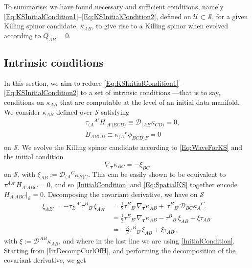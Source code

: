 \documentclass[10pt,a4paper]{article}
\theoremstyle{plain}
\begin{document}
To summarise: we have found necessary and sufficient conditions, namely \eqref{Eq:KSInitialCondition1}--\eqref{Eq:KSInitialCondition2}, defined on $\mathcal{U}\subset \mathcal{S}$, for a given Killing spinor candidate, $\kappa_{AB}$, to give rise to a Killing spinor when evolved according to $Q_{AB}=0$. 

\subsection{Intrinsic conditions}

In this section, we aim to reduce \eqref{Eq:KSInitialCondition1}--\eqref{Eq:KSInitialCondition2} to a set of intrinsic conditions ---that is to say, conditions on $\kappa_{AB}$ that are computable at the level of an initial data manifold. We consider $\kappa_{AB}$ defined over $\mathcal{S}$ satisfying
\begin{subequations}
\begin{eqnarray}
      && \tau_{(A}{}^{A'}H_{\vert A'\vert BCD)} \equiv  \mathcal{D}_{(AB}\kappa_{CD)}=0, \label{Eq:SpatialKS}\\
      && B_{ABCD}\equiv \kappa_{(A}{}^F\phi_{BCD)F} = 0 \label{Eq:VanishingBuchdahl}
\end{eqnarray}
\end{subequations}
on $\mathcal{S}$. We evolve the Killing spinor candidate according to \eqref{Eq:WaveForKS} and the initial condition
\begin{equation}
     \nabla_{\bm\tau} \kappa_{BC} = - \xi_{BC}\label{InitialCondition}
\end{equation}
on $\mathcal{S}$, with $\xi_{AB}:=\mathcal{D}_{(A}{}^C\kappa_{B)C}$. This can be easily shown to be equivalent to $\tau^{AA'}H_{A'ABC}=0$, and so \eqref{InitialCondition} and \eqref{Eq:SpatialKS} together encode $H_{A'ABC}\big\vert_{\mathcal{S}}=0$. Decomposing the covariant derivative, we have on $\mathcal{S}$
\begin{align}
\xi_{AB'} =  - \tau_{B}{}^{A'} \tau^{B}{}_{B'}\xi_{AA'} &=\tfrac{1}{2}\tau^{B}{}_{B'}\nabla_{\bm\tau}\kappa_{AB} + \
\tau^{B}{}_{B'} \mathcal{D}_{BC}\kappa_{A}{}^{C}. \nonumber\\
&=\tfrac{1}{2}\tau^{B}{}_{B'}\nabla_{\bm\tau}\kappa_{AB} - \tau^B{}_{B'}\xi_{AB} + \xi\tau_{AB'} \nonumber\\
&= -\tfrac{3}{2} \tau^B{}_{B'}\xi_{AB} + \xi\tau_{AB'} \label{DecompXiOnSUsingInitialCondition},
\end{align}
with $\xi:=\mathcal{D}^{AB}\kappa_{AB}$, and where in the last line we are using \eqref{InitialCondition}. Starting from \eqref{IrrDecompCurlOfH}, and performing the decomposition of the covariant derivative, we get
\end{document}
